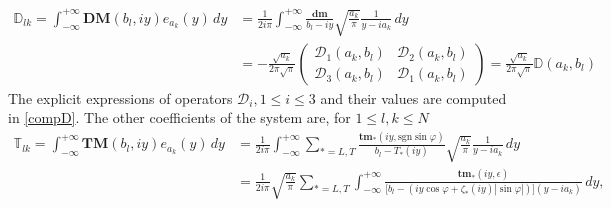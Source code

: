 \begin{equation}
\begin{split}
\mathbb{D}_{lk}=\int_{-\infty}^{+\infty} \textbf{DM}(b_l,iy)e_{a_k}(y) \, dy &=\frac{1}{2i\pi} \int_{-\infty}^{+\infty} \frac{\mathbf{dm}}{b_l-iy} 
\sqrt{\frac{a_k}{\pi}}\frac{1}{y-ia_k} \, dy \\
&=- \frac{\sqrt{a_k}}{2\pi \sqrt{\pi}}
\begin{pmatrix}
\mathcal{D}_1(a_k,b_l) & \mathcal{D}_2(a_k,b_l) \\
\mathcal{D}_3(a_k,b_l) &\mathcal{D}_1(a_k,b_l)
\end{pmatrix}=\frac{\sqrt{a_k}}{2\pi \sqrt{\pi}}\mathbb{D}(a_k,b_l)
\end{split}
\label{Dab}
\end{equation}
The explicit expressions of operators $\mathcal{D}_i, 1\leq i\leq3$ and their values are computed in \ref{compD}.
The other coefficients of the system are, for $1\leq l,k \leq N$
\begin{equation}
\begin{split}
\mathbb{T}_{lk}=\int_{-\infty}^{+\infty} \textbf{TM}(b_l,iy)e_{a_k}(y) \, dy 
&=\frac{1}{2i\pi} \int_{-\infty}^{+\infty} \sum_{*=L,T} \frac{\textbf{tm}_* (iy, \mbox{sgn} \sin \varphi)}{b_l-T_*(iy)} \sqrt{\frac{a_k}{\pi}}\frac{1}{y-ia_k}\,dy \\
&=\frac{1}{2i\pi}\sqrt{\frac{a_k}{\pi}}\sum_{*=L,T} \int_{-\infty}^{+\infty} \frac{\textbf{tm}_*(iy,\epsilon)}{\lbrack b_l-(iy \cos \varphi +  \zeta_*(iy)| \sin \varphi|)\rbrack(y-ia_k)} \, dy,
\end{split}
\end{equation}
